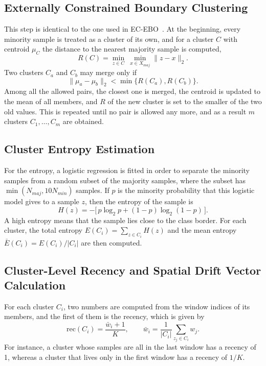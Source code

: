 \documentclass[preprint,10pt]{elsarticle}
\let\OldSubsection\subsection
\renewcommand{\subsection}{\OldSubsection}
\begin{document}
\subsection{Externally Constrained Boundary Clustering}
This step is identical to the one used in EC-EBO~\cite{tao2026}. At the beginning, every minority sample is treated as a cluster of its own, and for a cluster $C$ with centroid $\mu_C$ the distance to the nearest majority sample is computed,
\begin{equation}
R(C)=\min_{z\in C}\ \min_{x\in X_{maj}}\|z-x\|_2.
\end{equation}
Two clusters $C_a$ and $C_b$ may merge only if
\begin{equation}
\|\mu_a-\mu_b\|_2<\min\{R(C_a),R(C_b)\}.
\end{equation}
Among all the allowed pairs, the closest one is merged, the centroid is updated to the mean of all members, and $R$ of the new cluster is set to the smaller of the two old values. This is repeated until no pair is allowed any more, and as a result $m$ clusters $C_1,\ldots,C_m$ are obtained.

\subsection{Cluster Entropy Estimation}
For the entropy, a logistic regression is fitted in order to separate the minority samples from a random subset of the majority samples, where the subset has $\min(N_{maj},10N_{min})$ samples. If $p$ is the minority probability that this logistic model gives to a sample $z$, then the entropy of the sample is
\begin{equation}
H(z)=-\big[\,p\log_2 p+(1-p)\log_2(1-p)\,\big].
\end{equation}
A high entropy means that the sample lies close to the class border. For each cluster, the total entropy $E(C_i)=\sum_{z\in C_i}H(z)$ and the mean entropy $\bar E(C_i)=E(C_i)/|C_i|$ are then computed.

\subsection{Cluster-Level Recency and Spatial Drift Vector Calculation}
For each cluster $C_i$, two numbers are computed from the window indices of its members, and the first of them is the recency, which is given by
\begin{equation}
\mathrm{rec}(C_i)=\frac{\bar w_i+1}{K},\qquad \bar w_i=\frac{1}{|C_i|}\sum_{z_j\in C_i}w_j.
\end{equation}
For instance, a cluster whose samples are all in the last window has a recency of 1, whereas a cluster that lives only in the first window has a recency of $1/K$.
\end{document}
